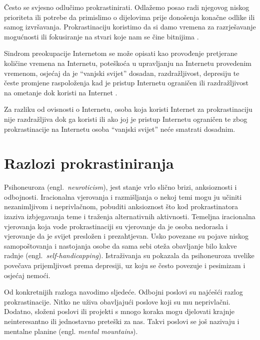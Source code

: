 \documentclass[11pt,twocolumn,english]{article}
\newcommand{\engl}[1]{(engl.~\emph{#1})}
\begin{document}
Često se svjesno odlučimo prokrastinirati. Odlažemo posao radi njegovog niskog
prioriteta ili potrebe da primislimo o dijelovima prije donošenja konačne odlike
ili samog izvršavanja. Prokrastinaciju koristimo da si damo vremena za
razrješavanje mogućnosti ili fokusiranje na stvari koje nam se čine bitnijima
\cite{burka2004procrastination}.

Sindrom preokupacije Internetom se može opisati kao provođenje pretjerane
količine vremena na Internetu, poteškoća u upravljanju na Internetu provedenim
vremenom, osjećaj da je ``vanjski svijet'' dosadan, razdražljivost, depresiju
te česte promjene raspoloženja kad je pristup Internetu ograničen ili
razdražljivost na ometanje dok koristi na Internet
\cite{yellowlees2007problematic}.
 
Za razliku od ovisnosti o Internetu, osoba koja koristi Internet za
prokrastinaciju nije razdražljiva dok ga koristi ili ako joj je pristup
Internetu ograničen te zbog prokrastinacije na Internetu osoba ``vanjski
svijet'' neće smatrati dosadnim.


\section{Razlozi prokrastiniranja}

Psihoneuroza \engl{neuroticism}, jest stanje vrlo slično brizi,
anksioznosti i odbojnosti. Iracionalna vjerovanja i razmišljanja o nekoj temi
mogu ju učiniti nezanimljivom i neprivlačnom, pobuditi anksioznost što kod
prokrastinatora izaziva izbjegavanja teme i traženja alternativnih aktivnosti.
Temeljna iracionalna vjerovanja koja vode prokrastinaciji su vjerovanje da je
osoba nedorasla i vjerovanje da je svijet presložen i prezahtjevan. Usko
povezane su pojave niskog samopoštovanja i nastojanja osobe da sama sebi oteža
obavljanje bilo kakve radnje \engl{self-handicapping}. Istraživanja
\cite{Caballero95neuro, Saklofske95neuro} su pokazala da psihoneuroza uvelike
povečava prijemljivost prema depresiji, uz koju se često povezuje i pesimizam i
osjećaj nemoći.

Od konkretnijih razloga \cite{PickBrain5reasons,Lifehack6reasons} navodimo
sljedeće. Odbojni poslovi su najćešći razlog prokrastinacije. Nitko ne uživa
obavljajući poslove koji su mu neprivlačni. Dodatno, složeni poslovi ili
projekti s mnogo koraka mogu djelovati krajnje neinteresantno ili jednostavno
preteški za nas. Takvi poslovi se još nazivaju i mentalne planine (engl.
\emph{mental mountains}).
\end{document}
